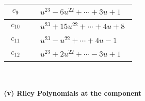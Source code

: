 \documentclass[1p]{elsarticle_modified}
\theoremstyle{definition}
\begin{document}
\begin{tabular}{m{50pt}|m{274pt}}
\hline $$\begin{aligned}c_{9}\end{aligned}$$&$\begin{aligned}
&u^{23}-6 u^{22}+\cdots+3 u+1
\end{aligned}$\\
\hline $$\begin{aligned}c_{10}\end{aligned}$$&$\begin{aligned}
&u^{23}+15 u^{22}+\cdots+4 u+8
\end{aligned}$\\
\hline $$\begin{aligned}c_{11}\end{aligned}$$&$\begin{aligned}
&u^{23}- u^{22}+\cdots+4 u-1
\end{aligned}$\\
\hline $$\begin{aligned}c_{12}\end{aligned}$$&$\begin{aligned}
&u^{23}+2 u^{22}+\cdots-3 u+1
\end{aligned}$\\
\hline
\end{tabular}\\~\\
\newpage\renewcommand{\arraystretch}{1}
\flushleft \textbf{(v) Riley Polynomials at the component}\newline \\
\end{document}

